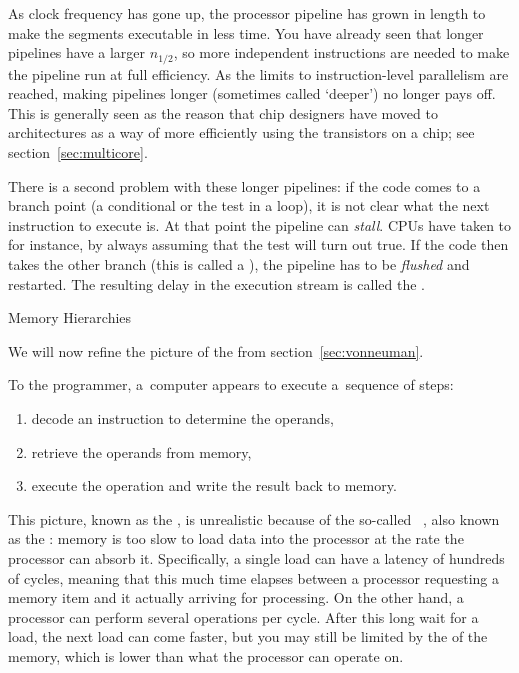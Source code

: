 As clock frequency has gone up, the processor pipeline has grown in
length to make the segments executable in less time. You have already
seen that longer pipelines have a larger $n_{1/2}$, so more
independent instructions are needed to make the pipeline run at full
efficiency. As the limits to instruction-level parallelism are
reached, making pipelines longer (sometimes
called `deeper') no longer pays off. This is
generally seen as the reason that chip designers have moved to
 architectures as a way of more efficiently
using the transistors on a chip;
see section~\ref{sec:multicore}.

There is a second problem with these longer pipelines: if the code
comes to a branch point (a conditional or the test in a loop), it is
not clear what the next instruction to execute is. At that point the
pipeline can \emph{stall}. \acp{CPU} have taken to
 for instance, by always assuming
that the test will turn out true. If the code then takes the other
branch (this is called a ), the
pipeline has to be \emph{flushed} and
restarted. The resulting delay in the execution stream is called the
.

 {Memory Hierarchies}
\label{sec:hierarchy}

We will now refine the picture of the 
from section~\ref{sec:vonneuman}.

To the programmer, a~computer appears to execute a~sequence of steps:
\begin{enumerate}
\item decode an instruction to determine the operands,
\item retrieve the operands from memory,
\item execute the operation and write the result back to memory.
\end{enumerate}
This picture,
known as  the ,
is unrealistic because of the
so-called ~\cite{Wulf:memory-wall},
also known as the :
memory is too slow to load data into the processor at the rate the
processor can absorb it.
Specifically, a single load can have a latency of
hundreds of cycles,
meaning that this much time elapses between a processor requesting a memory
item and it actually arriving for processing.
On the other hand, a processor can perform several operations per cycle.
  After this long wait for a load, the next load can come faster,
  but you may still be limited by the 
  of the memory,
  which is lower than what the processor can operate on.

